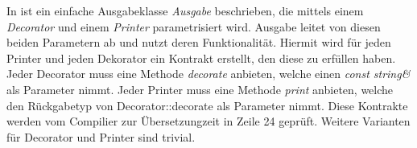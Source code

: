 In  ist ein einfache Ausgabeklasse \emph{Ausgabe} beschrieben, die mittels einem \emph{Decorator} und einem \emph{Printer} parametrisiert wird. Ausgabe leitet von diesen beiden Parametern ab und nutzt deren Funktionalität. Hiermit wird für jeden Printer und jeden Dekorator ein Kontrakt erstellt, den diese zu erfüllen haben. Jeder Decorator muss eine Methode \emph{decorate} anbieten, welche einen \emph{const string\&} als Parameter nimmt. Jeder Printer muss eine Methode \emph{print} anbieten, welche den Rückgabetyp von Decorator::decorate als Parameter nimmt. Diese Kontrakte werden vom Compilier zur Übersetzungzeit in Zeile 24 geprüft. Weitere Varianten für Decorator und Printer sind trivial.


